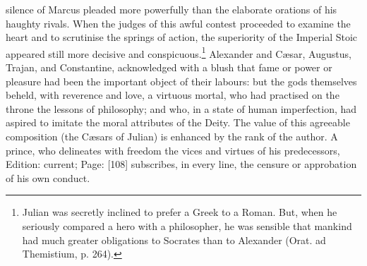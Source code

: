 silence of Marcus pleaded more powerfully than the elaborate orations of his haughty rivals. When the judges of this awful contest proceeded to examine the heart and to scrutinise the springs of action, the superiority of the Imperial Stoic appeared still more decisive and conspicuous.\footnote{Julian was secretly inclined to prefer a Greek to a Roman. But, when he seriously compared a hero with a philosopher, he was sensible that mankind had much greater obligations to Socrates than to Alexander (Orat. ad Themistium, p. 264).} Alexander and Cæsar, Augustus, Trajan, and Constantine, acknowledged with a blush that fame or power or pleasure had been the important object of their labours: but the gods themselves beheld, with reverence and love, a virtuous mortal, who had practised on the throne the lessons of philosophy; and who, in a state of human imperfection, had aspired to imitate the moral attributes of the Deity. The value of this agreeable composition (the Cæsars of Julian) is enhanced by the rank of the author. A prince, who delineates with freedom the vices and virtues of his predecessors, Edition: current; Page: [108] subscribes, in every line, the censure or approbation of his own conduct.

